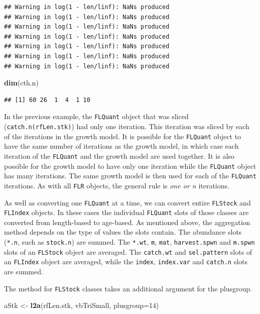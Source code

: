 \documentclass[
]{book}
\newenvironment{Shaded}{\begin{snugshade}}{\end{snugshade}}
\newcommand{\AttributeTok}[1]{\textcolor[rgb]{0.13,0.29,0.53}{#1}}
\newcommand{\DecValTok}[1]{\textcolor[rgb]{0.00,0.00,0.81}{#1}}
\newcommand{\FunctionTok}[1]{\textcolor[rgb]{0.13,0.29,0.53}{\textbf{#1}}}
\newcommand{\NormalTok}[1]{#1}
\newcommand{\OtherTok}[1]{\textcolor[rgb]{0.56,0.35,0.01}{#1}}
\begin{document}
\begin{verbatim}
## Warning in log(1 - len/linf): NaNs produced
## Warning in log(1 - len/linf): NaNs produced
## Warning in log(1 - len/linf): NaNs produced
## Warning in log(1 - len/linf): NaNs produced
## Warning in log(1 - len/linf): NaNs produced
## Warning in log(1 - len/linf): NaNs produced
## Warning in log(1 - len/linf): NaNs produced
\end{verbatim}

\begin{Shaded}
\begin{Highlighting}[]
\FunctionTok{dim}\NormalTok{(cth.n)}
\end{Highlighting}
\end{Shaded}

\begin{verbatim}
## [1] 60 26  1  4  1 10
\end{verbatim}

In the previous example, the \texttt{FLQuant} object that was sliced (\texttt{catch.n(rfLen.stk)}) had only one iteration. This iteration was sliced by each of the iterations in the growth model. It is possible for the \texttt{FLQuant} object to have the same number of iterations as the growth model, in which case each iteration of the \texttt{FLQuant} and the growth model are used together. It is also possible for the growth model to have only one iteration while the \texttt{FLQuant} object has many iterations. The same growth model is then used for each of the \texttt{FLQuant} iterations. As with all \texttt{FLR} objects, the general rule is \emph{one or n} iterations.

As well as converting one \texttt{FLQuant} at a time, we can convert entire \texttt{FLStock} and \texttt{FLIndex} objects. In these cases the individual \texttt{FLQuant} slots of those classes are converted from length-based to age-based. As mentioned above, the aggregation method depends on the type of values the slots contain. The abundance slots (\texttt{*.n}, such as \texttt{stock.n}) are summed. The \texttt{*.wt}, \texttt{m}, \texttt{mat}, \texttt{harvest.spwn} and \texttt{m.spwn} slots of an \texttt{FLStock} object are averaged. The \texttt{catch.wt} and \texttt{sel.pattern} slots of an \texttt{FLIndex} object are averaged, while the \texttt{index}, \texttt{index.var} and \texttt{catch.n} slots are summed.

The method for \texttt{FLStock} classes takes an additional argument for the plusgroup.

\begin{Shaded}
\begin{Highlighting}[]
\NormalTok{aStk }\OtherTok{\textless{}{-}} \FunctionTok{l2a}\NormalTok{(rfLen.stk, vbTriSmall, }\AttributeTok{plusgroup=}\DecValTok{14}\NormalTok{)}
\end{Highlighting}
\end{Shaded}
\end{document}
